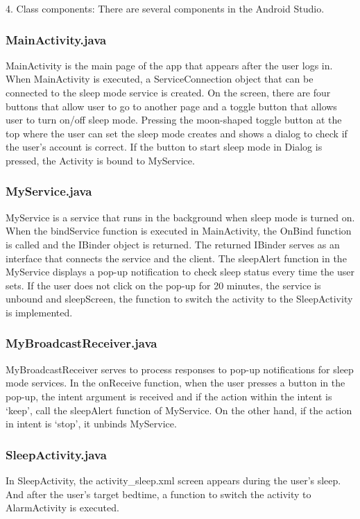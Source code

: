 \documentclass[conference]{IEEEtran}
\begin{document}
\par 4. Class components: There are several components in the Android Studio.
\subsubsection{MainActivity.java}
MainActivity is the main page of the app that appears after the user logs in. When MainActivity is executed, a ServiceConnection object that can be connected to the sleep mode service is created. On the screen, there are four buttons that allow user to go to another page and a toggle button that allows user to turn on/off sleep mode. Pressing the moon-shaped toggle button at the top where the user can set the sleep mode creates and shows a dialog to check if the user's account is correct. If the button to start sleep mode in Dialog is pressed, the Activity is bound to MyService.
\break

\subsubsection{MyService.java}
MyService is a service that runs in the background when sleep mode is turned on. When the bindService function is executed in MainActivity, the OnBind function is called and the IBinder object is returned. The returned IBinder serves as an interface that connects the service and the client. The sleepAlert function in the MyService displays a pop-up notification to check sleep status every time the user sets. If the user does not click on the pop-up for 20 minutes, the service is unbound and sleepScreen, the function to switch the activity to the SleepActivity is implemented.
\break
\subsubsection{MyBroadcastReceiver.java}
MyBroadcastReceiver serves to process responses to pop-up notifications for sleep mode services. In the onReceive function, when the user presses a button in the pop-up, the intent argument is received and if the action within the intent is ‘keep', call the sleepAlert function of MyService. On the other hand, if the action in intent is ‘stop', it unbinds MyService.
\break
\subsubsection{SleepActivity.java}
In SleepActivity, the activity\_sleep.xml screen appears during the user's sleep. And after the user's target bedtime, a function to switch the activity to AlarmActivity is executed.
\break
\end{document}
